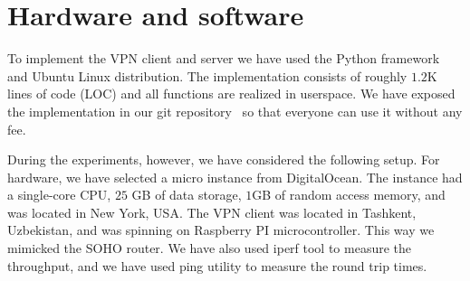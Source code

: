 \section{Hardware and software}
\label{sec:hardware}

To implement the VPN client and server we have used the Python 
framework and Ubuntu Linux distribution. The implementation consists 
of roughly $1.2$K lines of code (LOC) and all functions are realized 
in userspace. We have exposed the implementation in our git 
repository~\cite{impl} so that everyone can use it without any fee.

During the experiments, however, we have considered the following setup. 
For hardware, we have selected a micro instance from DigitalOcean. The 
instance had a single-core CPU, $25$ GB of data storage, $1$GB of random 
access memory, and was located in New York, USA. The VPN client was located 
in Tashkent, Uzbekistan, and was spinning on Raspberry PI microcontroller. 
This way we mimicked the SOHO router. We have also used iperf tool to measure 
the throughput, and we have used ping utility to measure the round trip times. 

